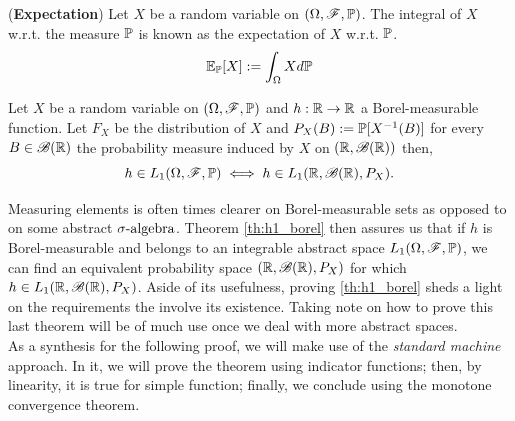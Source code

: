 \documentclass[../TGMAFFIRO.tex]{subfiles}
\begin{document}
\begin{definition} (\textbf{Expectation})
	Let $X$ be a random variable on $(\Omega, \mathscr{F}, \mathbb{P})$. The integral of $X$ w.r.t. the measure $\mathbb{P}$ is known as the expectation of $X$ w.r.t. $\mathbb{P}$. 
	\begin{equation}
		\mathbb{E}_{\mathbb{P}}[X] := \int_\Omega X d\mathbb{P}
	\end{equation}
\end{definition}


\begin{theorem}\label{th:h1_borel}
		Let $X$ be a random variable on $(\Omega, \mathscr{F}, \mathbb{P})$ and $h: \mathbb{R} \to \mathbb{R}$ a Borel-measurable function. Let $F_X$ be the distribution of $X$ and $P_X(B):= \mathbb{P}[X^{-1}(B)]$ for every $B \in \mathscr{B}(\mathbb{R})$ the probability measure induced by $X$ on $(\mathbb{R}, \mathscr{B}(\mathbb{R}))$ then,
		\begin{equation}
			h \in L_1(\Omega, \mathscr{F}, \mathbb{P}) \iff h \in L_1(\mathbb{R}, \mathscr{B}(\mathbb{R}), P_X).
		\end{equation}
\end{theorem}

Measuring elements is often times clearer on Borel-measurable sets as opposed to on some abstract $\sigma\text{-algebra}$. Theorem \ref{th:h1_borel} then assures us that if $h$ is Borel-measurable and belongs to an integrable abstract space $L_1(\Omega, \mathscr{F}, \mathbb{P})$, we can find an equivalent probability space $(\mathbb{R}, \mathscr{B}(\mathbb{R}), P_X)$ for which $h \in L_1(\mathbb{R}, \mathscr{B}(\mathbb{R}), P_X)$. Aside of its usefulness, proving \ref{th:h1_borel} sheds a light on the requirements the involve its existence. Taking note on how to prove this last theorem will be of much use once we deal with more abstract spaces.\\

As a synthesis for the following proof, we will make use of the \textit{standard machine} approach. In it, we will prove the theorem using indicator functions; then, by linearity, it is true for simple function; finally, we conclude using the monotone convergence theorem.\\
\end{document}
